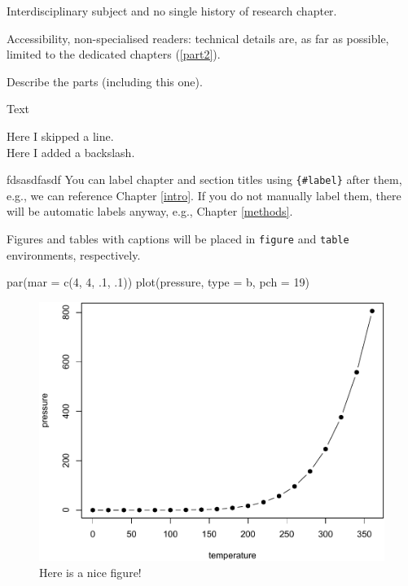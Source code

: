 \documentclass[
  12pt,
]{book}
\newenvironment{Shaded}{\begin{snugshade}}{\end{snugshade}}
\newcommand{\AttributeTok}[1]{\textcolor[rgb]{0.77,0.63,0.00}{#1}}
\newcommand{\DecValTok}[1]{\textcolor[rgb]{0.00,0.00,0.81}{#1}}
\newcommand{\FunctionTok}[1]{\textcolor[rgb]{0.00,0.00,0.00}{#1}}
\newcommand{\NormalTok}[1]{#1}
\newcommand{\StringTok}[1]{\textcolor[rgb]{0.31,0.60,0.02}{#1}}
\begin{document}
Interdisciplinary subject and no single history of research chapter.

Accessibility, non-specialised readers: technical details are, as far as possible, limited to the dedicated chapters (\ref{part2}).

Describe the parts (including this one).

Text

Here I skipped a line.\\
Here I added a backslash.

fdsasdfasdf You can label chapter and section titles using \texttt{\{\#label\}} after them, e.g., we can reference Chapter \ref{intro}. If you do not manually label them, there will be automatic labels anyway, e.g., Chapter \ref{methods}.

Figures and tables with captions will be placed in \texttt{figure} and \texttt{table} environments, respectively.

\begin{Shaded}
\begin{Highlighting}[]
\FunctionTok{par}\NormalTok{(}\AttributeTok{mar =} \FunctionTok{c}\NormalTok{(}\DecValTok{4}\NormalTok{, }\DecValTok{4}\NormalTok{, .}\DecValTok{1}\NormalTok{, .}\DecValTok{1}\NormalTok{))}
\FunctionTok{plot}\NormalTok{(pressure, }\AttributeTok{type =} \StringTok{\textquotesingle{}b\textquotesingle{}}\NormalTok{, }\AttributeTok{pch =} \DecValTok{19}\NormalTok{)}
\end{Highlighting}
\end{Shaded}

\begin{figure}

{\centering \includegraphics[width=0.8\linewidth]{bookdown-demo_files/figure-latex/nice-fig-1} 

}

\caption{Here is a nice figure!}\label{fig:nice-fig}
\end{figure}
\end{document}
